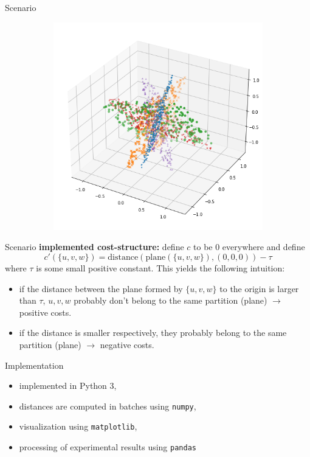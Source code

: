 \documentclass[10pt]{beamer}
\begin{document}
\begin{frame}{Scenario}
\begin{figure}
\begin{subfigure}{.4\textwidth}
            \includegraphics[width=\textwidth]{pics/ds4.png}
        \end{subfigure}
    \end{figure}
\end{frame}

\begin{frame}{Scenario}
    \textbf{implemented cost-structure:} define $c$ to be $0$ everywhere and define $$ c'(\{u,v,w\}) = \mathrm{distance}(\mathrm{plane}(\{u,v,w\}), (0,0,0)) - \tau $$ where $\tau$ is some small positive constant. \pause This yields the following intuition:
    \begin{itemize}
        \item if the distance between the plane formed by $\{u,v,w\}$ to the origin is larger than $\tau$, $u,v,w$ probably don't belong to the same partition (plane) $\rightarrow$ positive costs.
        \item if the distance is smaller respectively, they probably belong to the same partition (plane) $\rightarrow$ negative costs.
    \end{itemize} 
\end{frame}

\begin{frame}{Implementation}
    \begin{itemize}
        \item implemented in Python 3,
        \item distances are computed in batches using \texttt{numpy},
        \item visualization using \texttt{matplotlib},
        \item processing of experimental results using \texttt{pandas}
    \end{itemize}
\end{frame}
\end{document}
